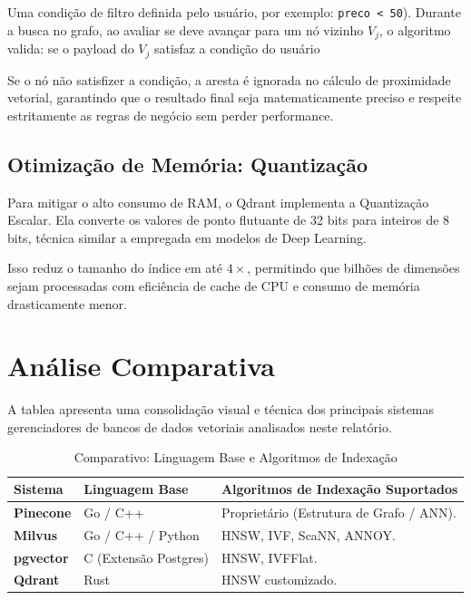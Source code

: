 \documentclass[a4paper, 12pt]{article} %
\begin{document}
Uma condição de filtro definida pelo usuário, por exemplo: \texttt{preco < 50}). Durante a busca no grafo, ao avaliar se deve avançar para um nó vizinho $V_j$, o algoritmo valida: se o payload do $V_j$ satisfaz a condição do usuário

Se o nó não satisfizer a condição, a aresta é ignorada no cálculo de proximidade vetorial, garantindo que o resultado final seja matematicamente preciso e respeite estritamente as regras de negócio sem perder performance.

\subsection{Otimização de Memória: Quantização}
Para mitigar o alto consumo de RAM, o Qdrant implementa a Quantização Escalar. Ela converte os valores de ponto flutuante de 32 bits para inteiros de 8 bits, técnica similar a empregada em modelos de Deep Learning.

Isso reduz o tamanho do índice em até $4\times$, permitindo que bilhões de dimensões sejam processadas com eficiência de cache de CPU e consumo de memória drasticamente menor.

\newpage

\section{Análise Comparativa}

A tablea apresenta uma consolidação visual e técnica dos principais sistemas gerenciadores de bancos de dados vetoriais analisados neste relatório.

\begin{table}[H]
\centering
\caption{Comparativo: Linguagem Base e Algoritmos de Indexação}
\label{tab:tecnologia_indexacao}
\small
\setlength{\extrarowheight}{3pt}
\begin{tabularx}{\textwidth}{l l X}
\toprule
\textbf{Sistema} & \textbf{Linguagem Base} & \textbf{Algoritmos de Indexação Suportados} \\
\midrule
\textbf{Pinecone} & Go / C++ & Proprietário (Estrutura de Grafo / ANN). \\
\addlinespace
\textbf{Milvus}   & Go / C++ / Python & HNSW, IVF, ScaNN, ANNOY. \\
\addlinespace
\textbf{pgvector} & C (Extensão Postgres) & HNSW, IVFFlat. \\
\addlinespace
\textbf{Qdrant}   & Rust & HNSW customizado. \\
\bottomrule
\end{tabularx}
\end{table}
\end{document}
